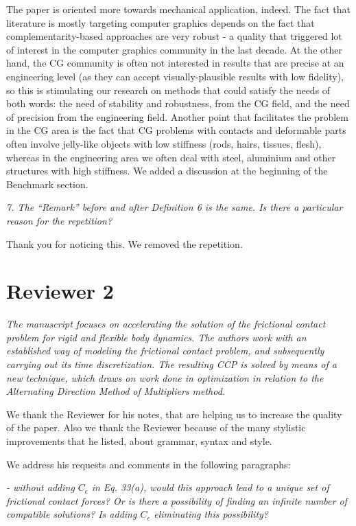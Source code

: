 \documentclass[final,12pt]{article}
\def\reviewercomment#1{{\vskip4mm \color{mycommentcolor} \textit{#1} \vskip2mm}}
\begin{document}
The paper is oriented more towards mechanical application, indeed. The fact that literature is mostly targeting computer graphics depends on the fact that complementarity-based approaches are very robust - a quality that triggered lot of interest in the computer graphics community in the last decade. At the other hand, the CG community is often not interested in results that are precise at an engineering level (as they can accept visually-plausible results with low fidelity), so this is stimulating our research on methods that could satisfy the needs of both words: the need of stability and robustness, from the CG field, and the need of precision from the engineering field. Another point that facilitates the problem in the CG area is the fact that CG problems with contacts and deformable parts often involve jelly-like objects with low stiffness (rods, hairs, tissues, flesh), whereas in the engineering area we often deal with steel, aluminium and other structures with high stiffness. We added a discussion at the beginning of the Benchmark section.
 

\reviewercomment{
7. The “Remark” before and after Definition 6 is the same. Is there a particular reason for the
repetition?
}

Thank you for noticing this. We removed the repetition.



\section{Reviewer 2}

\reviewercomment{
The manuscript focuses on accelerating the solution of the frictional contact problem for rigid and flexible body dynamics. The authors work with an established way of modeling the frictional contact problem, and subsequently carrying out its time discretization. The resulting CCP is solved by means of a new technique, which draws on work done in optimization in relation to the Alternating Direction Method of Multipliers method.
}

We thank the Reviewer for his notes, that are helping us to increase the quality of the paper. Also we thank the Reviewer because of the many stylistic improvements that he listed, about grammar, syntax and style.

 We address his requests and comments in the following paragraphs:
  

\reviewercomment{
- without adding $C_\epsilon$ in Eq. 33(a), would this approach lead to a unique set of frictional contact forces? Or is there a possibility of finding an infinite number of compatible solutions? Is adding $C_\epsilon$ eliminating this possibility?
}
\end{document}
